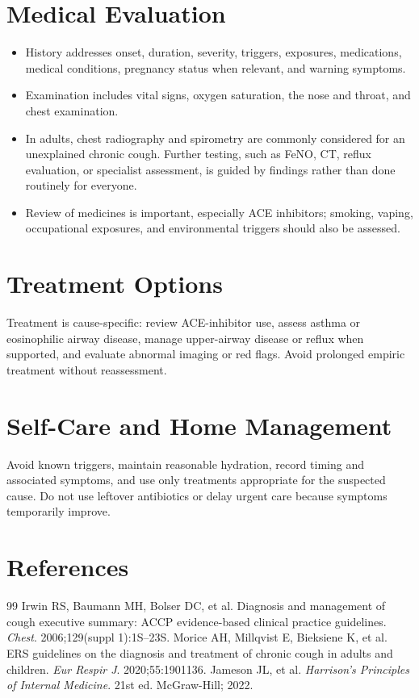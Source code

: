 \section*{Medical Evaluation}
\begin{itemize}
  \item History addresses onset, duration, severity, triggers, exposures, medications, medical conditions, pregnancy status when relevant, and warning symptoms.
  \item Examination includes vital signs, oxygen saturation, the nose and throat, and chest examination.
  \item In adults, chest radiography and spirometry are commonly considered for an unexplained chronic cough. Further testing, such as FeNO, CT, reflux evaluation, or specialist assessment, is guided by findings rather than done routinely for everyone.
  \item Review of medicines is important, especially ACE inhibitors; smoking, vaping, occupational exposures, and environmental triggers should also be assessed.
\end{itemize}

\section*{Treatment Options}
Treatment is cause-specific: review ACE-inhibitor use, assess asthma or eosinophilic airway disease, manage upper-airway disease or reflux when supported, and evaluate abnormal imaging or red flags. Avoid prolonged empiric treatment without reassessment.

\section*{Self-Care and Home Management}
Avoid known triggers, maintain reasonable hydration, record timing and associated symptoms, and use only treatments appropriate for the suspected cause. Do not use leftover antibiotics or delay urgent care because symptoms temporarily improve.

\section*{References}
\begin{thebibliography}{99}
 Irwin RS, Baumann MH, Bolser DC, et al. Diagnosis and management of cough executive summary: ACCP evidence-based clinical practice guidelines. \textit{Chest}. 2006;129(suppl 1):1S--23S.
 Morice AH, Millqvist E, Bieksiene K, et al. ERS guidelines on the diagnosis and treatment of chronic cough in adults and children. \textit{Eur Respir J}. 2020;55:1901136.
 Jameson JL, et al. \textit{Harrison's Principles of Internal Medicine}. 21st ed. McGraw-Hill; 2022.
\end{thebibliography}
